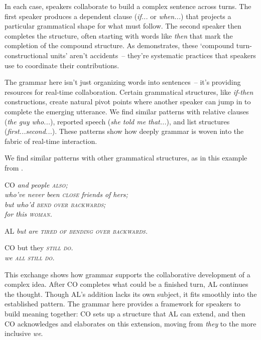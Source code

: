 In each case, speakers collaborate to build a complex sentence across turns. The first speaker produces a dependent clause (\textit{if...} or \textit{when...}) that projects a particular grammatical shape for what must follow. The second speaker then completes the structure, often starting with words like \textit{then} that mark the completion of the compound structure. As \citet{lerner1991} demonstrates, these `compound turn-constructional units' aren't accidents~-- they're systematic practices that speakers use to coordinate their contributions.

The grammar here isn't just organizing words into sentences~-- it's providing resources for real-time collaboration. Certain grammatical structures, like \textit{if-then} constructions, create natural pivot points where another speaker can jump in to complete the emerging utterance. We find similar patterns with relative clauses (\textit{the guy who...}), reported speech (\textit{she told me that...}), and list structures (\textit{first...second...}). These patterns show how deeply grammar is woven into the fabric of real-time interaction.

We find similar patterns with other grammatical structures, as in this example from \citet{szczepek2000}. 

\ea 
\begin{dialogue}
   \item[CO] \textit{and people \textsc{also};} \\
   \textit{who've never been \textsc{close} friends of hers;} \\
   \textit{but who'd \textsc{bend over backwards};} \\
   \textit{for this \textsc{woman.}}
   \item[AL] \textit{but are \textsc{tired of bending over backwards.}}
   \item[CO] but they \textsc{\textit{still do.}} \\
   \textit{we \textsc{all still do.}}
\end{dialogue}
\z
This exchange shows how grammar supports the collaborative development of a complex idea. After CO completes what could be a finished turn, AL continues the thought. Though AL's addition lacks its own subject, it fits smoothly into the established pattern. The grammar here provides a framework for speakers to build meaning together: CO sets up a structure that AL can extend, and then CO acknowledges and elaborates on this extension, moving from \textit{they} to the more inclusive \textit{we}.

